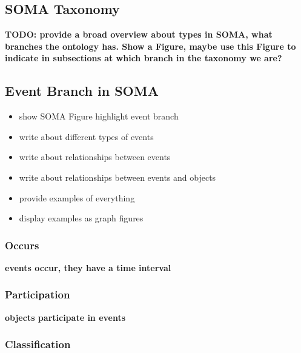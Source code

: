 \subsection{SOMA Taxonomy}
\label{sec:narrative:taxonomy}

\textbf{TODO: provide a broad overview about types in SOMA, what branches the ontology has. Show a Figure, maybe use this Figure to indicate in subsections at which branch in the taxonomy we are?}

\subsection{Event Branch in SOMA}
\begin{itemize}
\item show SOMA Figure highlight event branch
\item write about different types of events
\item write about relationships between events
\item write about relationships between events and objects
\item provide examples of everything
\item display examples as graph figures
\end{itemize}

\subsubsection{Occurs}
\textbf{events occur, they have a time interval}

\subsubsection{Participation}
\textbf{objects participate in events}

\subsubsection{Classification}

